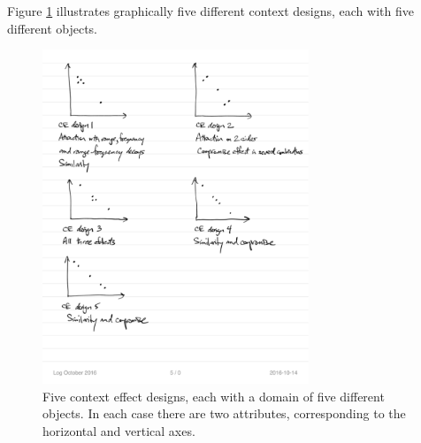 \documentclass[11pt,letter]{amsart}
\begin{document}
\label{s:CEdesigns}

Figure \ref{f:CEdesigns} illustrates graphically five different context
designs, each with five different objects.

\begin{figure}[tbp]
\caption{Five context effect designs, each with a domain of five different
objects. In each case there are two attributes, corresponding to the
horizontal and vertical axes.}
\label{f:CEdesigns}
\includegraphics[height=10cm]{CEdesigns.pdf}
\end{figure}

\end{document}
